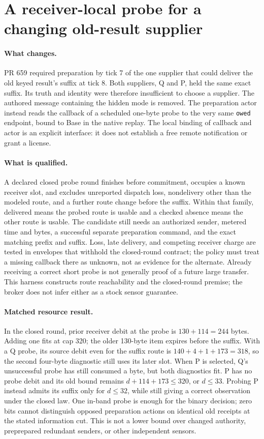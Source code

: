 \documentclass{article}
\begin{document}
\section*{A receiver-local probe for a changing old-result supplier}
\paragraph{What changes.}
PR 659 required preparation by tick 7 of the one supplier that
could deliver the old keyed result's suffix at tick 8. Both suppliers,
Q and P, held the same exact suffix. Its truth and identity were
therefore insufficient to choose a supplier. The authored message
containing the hidden mode is removed. The preparation actor instead
reads the callback of a scheduled one-byte probe to the very same
\texttt{owed} endpoint, bound to Base in the native replay.
The local binding of callback and actor is an explicit interface:
it does not establish a free remote notification or grant a license.

\paragraph{What is qualified.}
A declared closed probe round finishes before commitment, occupies a
known receiver slot, and excludes unreported dispatch loss, nondelivery
other than the modeled route, and a further route change before the
suffix. Within that family, delivered means the probed route is
usable and a checked absence means the other route is usable.
The candidate still needs an authorized sender, metered time and bytes,
a successful separate preparation command, and the exact matching
prefix and suffix. Loss, late delivery, and competing receiver charge
are tested in envelopes that withhold the closed-round contract;
the policy must treat a missing callback there as unknown, not as
evidence for the alternate. Already receiving a correct short probe
is not generally proof of a future large transfer. This harness
constructs route reachability and the closed-round premise; the
broker does not infer either as a stock sensor guarantee.

\paragraph{Matched resource result.}
In the closed round, prior receiver debit at the probe is
$130+114=244$ bytes. Adding one fits at cap 320; the older 130-byte
item expires before the suffix. With a Q probe, its source debit
even for the suffix route is $140+4+1+173=318$, so the second
four-byte diagnostic still uses its later slot. When P is selected,
Q's unsuccessful probe has still consumed a byte, but both diagnostics
fit. P has no probe debit and its old bound remains
$d+114+173\le320$, or $d\le33$. Probing P instead admits its suffix
only for $d\le32$, while still giving a correct observation under
the closed law. One in-band probe is enough for the binary decision;
zero bits cannot distinguish opposed preparation actions on
identical old receipts at the stated information cut. This is
not a lower bound over changed authority, preprepared redundant
senders, or other independent sensors.
\end{document}
